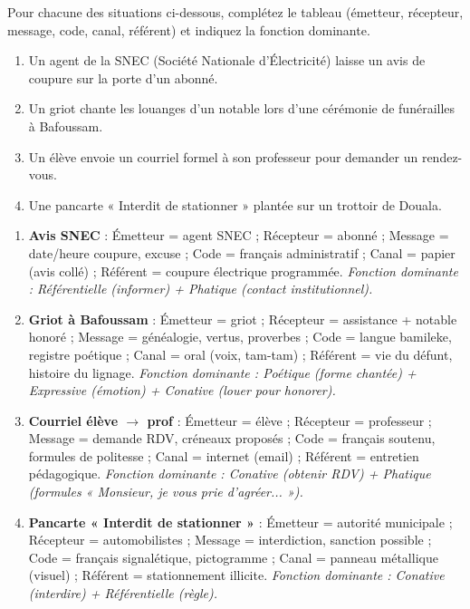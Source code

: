 \documentclass[11pt]{article}
\begin{document}
\begin{exercice}
Pour chacune des situations ci-dessous, complétez le tableau (émetteur, récepteur, message, code, canal, référent) et indiquez la fonction dominante.
\begin{enumerate}
\item Un agent de la SNEC (Société Nationale d'Électricité) laisse un avis de coupure sur la porte d'un abonné.
\item Un griot chante les louanges d'un notable lors d'une cérémonie de funérailles à Bafoussam.
\item Un élève envoie un courriel formel à son professeur pour demander un rendez-vous.
\item Une pancarte « Interdit de stationner » plantée sur un trottoir de Douala.
\end{enumerate}
\end{exercice}

\begin{corrige}[Exercice n°1]
\begin{enumerate}
\item \textbf{Avis SNEC} : Émetteur = agent SNEC ; Récepteur = abonné ; Message = date/heure coupure, excuse ; Code = français administratif ; Canal = papier (avis collé) ; Référent = coupure électrique programmée. \textit{Fonction dominante : Référentielle (informer) + Phatique (contact institutionnel).}
\item \textbf{Griot à Bafoussam} : Émetteur = griot ; Récepteur = assistance + notable honoré ; Message = généalogie, vertus, proverbes ; Code = langue bamileke, registre poétique ; Canal = oral (voix, tam-tam) ; Référent = vie du défunt, histoire du lignage. \textit{Fonction dominante : Poétique (forme chantée) + Expressive (émotion) + Conative (louer pour honorer).}
\item \textbf{Courriel élève $\rightarrow$ prof} : Émetteur = élève ; Récepteur = professeur ; Message = demande RDV, créneaux proposés ; Code = français soutenu, formules de politesse ; Canal = internet (email) ; Référent = entretien pédagogique. \textit{Fonction dominante : Conative (obtenir RDV) + Phatique (formules « Monsieur, je vous prie d'agréer... »).}
\item \textbf{Pancarte « Interdit de stationner »} : Émetteur = autorité municipale ; Récepteur = automobilistes ; Message = interdiction, sanction possible ; Code = français signalétique, pictogramme ; Canal = panneau métallique (visuel) ; Référent = stationnement illicite. \textit{Fonction dominante : Conative (interdire) + Référentielle (règle).}
\end{enumerate}
\end{corrige}
\end{document}
